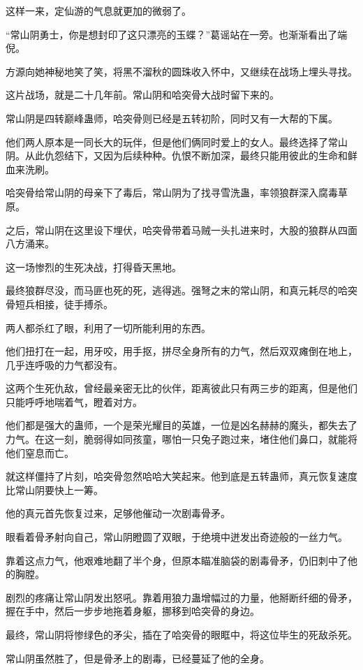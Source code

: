 \begin{this_body}
这样一来，定仙游的气息就更加的微弱了。

“常山阴勇士，你是想封印了这只漂亮的玉蝶？”葛谣站在一旁。也渐渐看出了端倪。

方源向她神秘地笑了笑，将黑不溜秋的圆珠收入怀中，又继续在战场上埋头寻找。

这片战场，就是二十几年前。常山阴和哈突骨大战时留下来的。

常山阴是四转巅峰蛊师，哈突骨则已经是五转初阶，同时又有一大帮的下属。

他们两人原本是一同长大的玩伴，但是他们俩同时爱上的女人。最终选择了常山阴。从此仇怨结下，又因为后续种种。仇恨不断加深，最终只能用彼此的生命和鲜血来洗刷。

哈突骨给常山阴的母亲下了毒后，常山阴为了找寻雪洗蛊，率领狼群深入腐毒草原。

之后，常山阴在这里设下埋伏，哈突骨带着马贼一头扎进来时，大股的狼群从四面八方涌来。

这一场惨烈的生死决战，打得昏天黑地。

最终狼群尽没，而马匪也死的死，逃得逃。强弩之末的常山阴，和真元耗尽的哈突骨短兵相接，徒手搏杀。

两人都杀红了眼，利用了一切所能利用的东西。

他们扭打在一起，用牙咬，用手抠，拼尽全身所有的力气，然后双双瘫倒在地上，几乎连呼吸的力气都没有。

这两个生死仇敌，曾经最亲密无比的伙伴，距离彼此只有两三步的距离，但是他们只能呼呼地喘着气，瞪着对方。

他们都是强大的蛊师，一个是荣光耀目的英雄，一位是凶名赫赫的魔头，都失去了力气。在这一刻，脆弱得如同孩童，哪怕一只兔子跑过来，堵住他们鼻口，就能将他们窒息而亡。

就这样僵持了片刻，哈突骨忽然哈哈大笑起来。他到底是五转蛊师，真元恢复速度比常山阴要快上一筹。

他的真元首先恢复过来，足够他催动一次剧毒骨矛。

眼看着骨矛射向自己，常山阴瞪圆了双眼，于绝境中迸发出奇迹般的一丝力气。

靠着这点力气，他艰难地翻了半个身，但原本瞄准脑袋的剧毒骨矛，仍旧刺中了他的胸膛。

剧烈的疼痛让常山阴发出怒吼。靠着用狼力蛊增幅过的力量，他掰断纤细的骨矛，握在手中，然后一步步地拖着身躯，挪移到哈突骨的身边。

最终，常山阴将惨绿色的矛尖，插在了哈突骨的眼眶中，将这位毕生的死敌杀死。

常山阴虽然胜了，但是骨矛上的剧毒，已经蔓延了他的全身。


\end{this_body}
